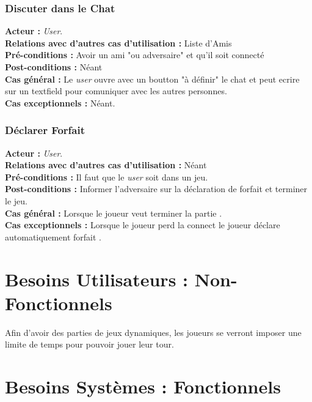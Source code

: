 \documentclass[10pt, a4paper]{article}
\begin{document}
\subsubsection{Discuter dans le Chat}
\textbf{Acteur :} \textit{User}.\\
\textbf{Relations avec d'autres cas d'utilisation :} Liste d'Amis\\
\textbf{Pré-conditions :} Avoir un ami "ou adversaire" et qu'il soit connecté\\ %
\textbf{Post-conditions :} Néant\\
\textbf{Cas général :} Le \textit{user} ouvre avec un boutton "à définir" le chat et peut ecrire sur un textfield pour comuniquer avec les autres personnes.\\ %
\textbf{Cas exceptionnels :} Néant.

\subsubsection{Déclarer Forfait}
\textbf{Acteur :} \textit{User}.\\
\textbf{Relations avec d'autres cas d'utilisation :} Néant\\
\textbf{Pré-conditions :} Il faut que le \textit{user} soit dans un jeu. \\
\textbf{Post-conditions :} Informer l'adversaire sur la déclaration de forfait et terminer le jeu.\\
\textbf{Cas général :} Lorsque le joueur veut terminer la partie .\\
\textbf{Cas exceptionnels :} Lorsque le joueur perd la connect le joueur déclare automatiquement forfait .%

\section{Besoins Utilisateurs : Non-Fonctionnels}
Afin d'avoir des parties de jeux dynamiques, les joueurs se verront imposer une limite de temps pour pouvoir jouer leur tour. \\
		
\section{Besoins Systèmes : Fonctionnels}
\end{document}
